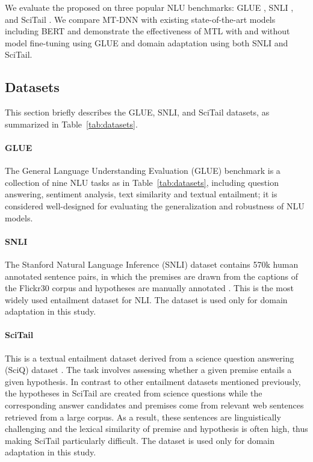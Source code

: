 We evaluate the proposed {\MNAME} on three popular NLU benchmarks: GLUE \cite{wang2018glue}, SNLI \cite{snli2015}, and SciTail \cite{scitail}. 
We compare MT-DNN with existing state-of-the-art models including BERT 
and demonstrate the effectiveness of MTL with and without model fine-tuning using GLUE and domain adaptation using both SNLI and SciTail. 

\subsection{Datasets}
\label{subsec:dataset}
This section briefly describes the GLUE, SNLI, and SciTail datasets, as summarized in Table~\ref{tab:datasets}.

\paragraph{GLUE} The General Language Understanding Evaluation (GLUE) benchmark is a collection of nine NLU tasks as in Table~\ref{tab:datasets}, including question answering, sentiment analysis, text similarity and textual entailment; it is considered well-designed for evaluating the generalization and robustness of NLU models. 

\paragraph{SNLI}
The Stanford Natural Language Inference (SNLI) dataset contains 570k human annotated sentence pairs, in which the premises are drawn from the captions of the Flickr30 corpus and hypotheses are manually annotated \cite{snli2015}. %
This is the most widely used entailment dataset for NLI.
The dataset is used only for domain adaptation in this study.

\paragraph{SciTail}
This is a textual entailment dataset derived from a science question answering (SciQ) dataset \cite{scitail}. The task involves assessing whether a given premise entails a given hypothesis.  
In contrast to other entailment datasets mentioned previously, the hypotheses in SciTail are created from science questions while the corresponding answer candidates and premises come from relevant web sentences retrieved from a large corpus. As a result, these sentences are linguistically challenging and the lexical similarity of premise and hypothesis is often high, thus making SciTail particularly difficult. 
The dataset is used only for domain adaptation in this study.

